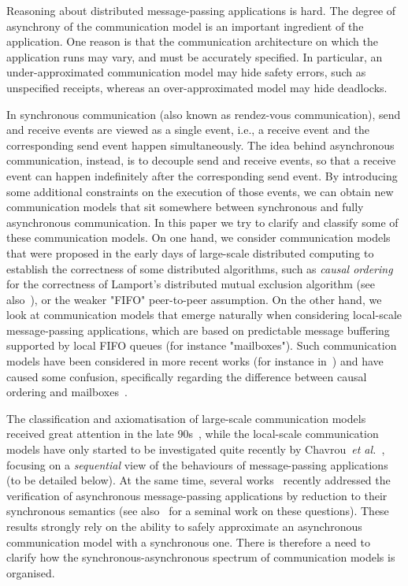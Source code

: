

Reasoning about distributed message-passing applications is  hard. The degree of asynchrony
of the communication model is  an important ingredient of the application.
One reason
is that the communication architecture on which the application runs may vary, and must be accurately specified. In particular, an under-approximated communication model may hide safety errors,
such as unspecified receipts, whereas an over-approximated model may hide deadlocks. 

In synchronous communication (also known as rendez-vous communication), send and receive events are viewed as
a single event, i.e., a receive event and the corresponding send event happen simultaneously. The idea behind asynchronous communication, instead, is to decouple send and receive events, so that a receive event can happen indefinitely after the corresponding send event. By introducing some additional constraints on the execution of those events, we can obtain new communication models that sit somewhere between synchronous and fully asynchronous communication.
In this paper we try to clarify and classify some of these communication models.
On  one hand, we consider communication models that were proposed in the early days of large-scale distributed computing to establish the correctness of some distributed algorithms, such as \emph{causal ordering}~\cite{Lamport78} for the correctness of Lamport's distributed mutual exclusion algorithm (see also~\cite{Renesse93}), or the weaker "FIFO" peer-to-peer assumption. On the other hand, we look at communication models that emerge
naturally when considering local-scale message-passing applications, which are based on predictable
message buffering supported by local FIFO queues (for instance "mailboxes"). Such communication models have
been considered in more recent works (for instance in~\cite{DBLP:journals/tcs/BasuB16}) and have caused
some confusion, specifically regarding the difference between causal ordering and mailboxes~\cite{DBLP:conf/cav/BouajjaniEJQ18,DBLP:conf/fossacs/GiustoLL20}.

The classification and axiomatisation of large-scale communication models received great attention in the late 90s~\cite{DBLP:journals/dc/Charron-BostMT96}, while the local-scale communication models have only started to be investigated quite recently by Chavrou~\emph{et al.}~\cite{DBLP:journals/fac/ChevrouHQ16}, focusing on a \emph{sequential} view of the behaviours of message-passing
applications (to be detailed below).
At the same time, several works~\cite{KraglQH18,GleissenthallKB19,DBLP:conf/cav/BouajjaniEJQ18,DBLP:conf/cav/LangeY19} recently addressed the verification of
asynchronous message-passing applications by reduction to their synchronous semantics (see also~\cite{Lipton75} for a seminal work on these questions). These results strongly rely on the ability to safely approximate an asynchronous communication model with a synchronous one. There is therefore a need to clarify how the synchronous-asynchronous spectrum of communication models is organised.

